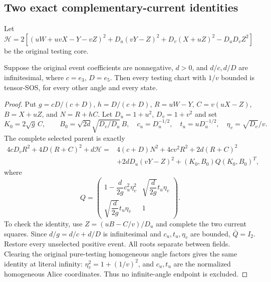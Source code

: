 \subsection{Two exact complementary-current identities}

\label{component:p6cad7544d1b8}

\label{p6cad7544d1b8:sec:c1-uniform-all-tests}

Let $\mathcal H=2[(uW+uvX-Y-vZ)^2+D_u(vY-Z)^2+D_v(X+uZ)^2-D_uD_vZ^2]$ be the original testing core.

\begin{lemma}\label{lem:c1-two-current}
Suppose the original event coefficients are nonnegative, $d>0$, and
$d/c,d/D$ are infinitesimal, where $c=e_3$, $D=e_5$.
Then every testing chart with $1/v$ bounded is tensor-SOS, for every
other angle and every state.
\end{lemma}
\begin{proof}
Put $g=cD/(c+D)$, $h=D/(c+D)$, $R=uW-Y$,
$C=v(uX-Z)$, $B=X+uZ$, and $N=R+hC$.
Let $D_u=1+u^2$, $D_v=1+v^2$ and set
\[
 K_0=2\sqrt g\,C,\qquad
 B_0=\sqrt{2d}\sqrt{D_v/D_u}\,B,\quad
 c_u=D_u^{-1/2},\quad t_u=uD_u^{-1/2},\quad
 \eta_v=\sqrt{D_v}/v.
\]
The complete selected parent is exactly
\[
\begin{split}
4cD_vR^2+4D(R+C)^2+d\mathcal H
={}&4(c+D)N^2+4cv^2R^2+2d(R+C)^2\\
 &+2dD_u(vY-Z)^2+(K_0,B_0)Q(K_0,B_0)^T,
\end{split}
\]
where
\[
 Q=\begin{pmatrix}
 1-\dfrac{d}{2g}c_u^2\eta_v^2&
 \sqrt{\dfrac{d}{2g}}t_u\eta_v\\
 \sqrt{\dfrac{d}{2g}}t_u\eta_v&1
 \end{pmatrix}.
\]
To check the identity, use $Z=(uB-C/v)/D_u$ and complete the two current
squares. Since $d/g=d/c+d/D$ is infinitesimal and $c_u,t_u,\eta_v$
are bounded, $\bar Q=I_2$. Restore every unselected positive event.
All roots separate between fields. Clearing the original pure-testing
homogeneous angle factors gives the same identity at literal infinity:
$\eta_v^2=1+(1/v)^2$, and $c_u,t_u$ are the normalized homogeneous
Alice coordinates. Thus no infinite-angle endpoint is excluded.
\end{proof}

